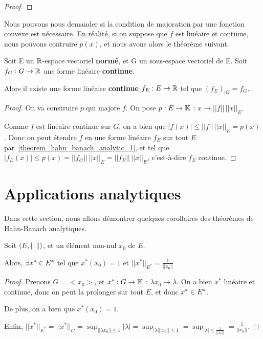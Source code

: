 \ifdefined\outputproof
\begin{proof}

\end{proof}
\fi

Nous pouvons nous demander si la condition de majoration par une fonction
convexe est nécessaire. En réalité, si on suppose que $f$ est linéaire et
continue, nous pouvons contruire $p(x)$, et nous avons alors le théorème
suivant.

\begin{theorem} 
\label{theorem_hahn_banach_analytic_2}
	Soit E un $\mathbb{R}$-espace vectoriel \textbf{normé}, et G un sous-espace
	vectoriel de E.
	Soit $f_{G} : G \rightarrow \mathbb{R}$ une forme linéaire
	\textbf{continue}.

	Alors il existe une forme linéaire \textbf{continue}
	$f_{E} : E \rightarrow \mathbb{R}$ tel que $(f_{E})_{|G} = f_{G}$.
\end{theorem}

\ifdefined\outputproof
\begin{proof}
	On va construire $p$ qui majore $f$.
	On pose $p : E \rightarrow \mathbb{K}$ : $x \rightarrow ||f|| \,
	||x||_{E}$.

	Comme $f$ est linéaire continue sur $G$, on a bien que $|f(x)| \leq ||f|| \,
	||x||_{E} = p(x)$. Donc on peut étendre $f$ en une forme linéaire $f_{E}$
	sur tout $E$ par~\ref{theorem_hahn_banach_analytic_1}, et tel que
	$|f_{E}(x)| \leq p(x) = ||f_{G}|| \, ||x||_{E} = ||f_{E}|| \, ||x||_{E}$,
	c'est-à-dire $f_{E}$ continue.
\end{proof}
\fi
\section{Applications analytiques}

Dans cette section, nous allons démontrer quelques corollaires des théorèmes de
Hahn-Banach analytiques.

\begin{corollary}
	Soit $(E, \norm{.})$, et un élément non-nul $x_{0}$ de $E$.

	Alors, $\exists x^{*} \in E^{*}$ tel que $x^{*}(x_{0}) = 1$ et
	$||x^{*}||_{E^{*}} = \frac{1}{||x_{0}||}$
\end{corollary}

\ifdefined\outputproof
\begin{proof}
	Prenons $G = <x_{0}>$, et $x^{*} : G \rightarrow \mathbb{K}$ : $\lambda
	x_{0} \rightarrow \lambda$. On a bien $x^{*}$ linéaire et continue, donc on peut
	la prolonger sur tout $E$, et donc $x^{*} \in E^{*}$.

	De plus, on a bien que $x^{*}(x_{0}) = 1$.

	Enfin, $||x^{*}||_{E^{*}} = ||x^{*}||_{G} = \displaystyle \sup_{||\lambda x_{0}|| \leq
1}|\lambda| = \sup_{|\lambda|||x_{0}|| \leq 1} = \sup_{|\lambda| \leq
	\frac{1}{||x_{0}||}} = \frac{1}{||x_{0}||}$.
\end{proof}
\fi

